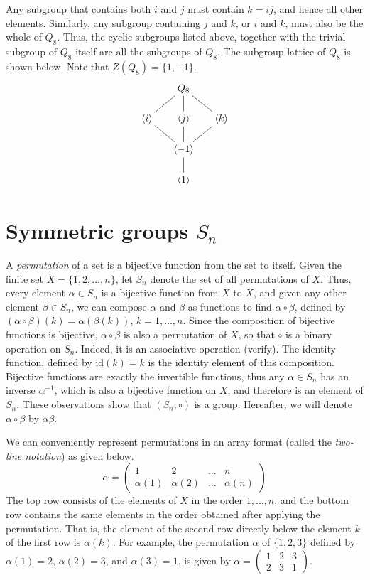 \documentclass[svgnames]{article}
\theoremstyle{definition}
\theoremstyle{remark}
\newcommand{\id}{\mathrm{id}}
\begin{document}
\begin{appendices}
Any subgroup that contains both $i$ and $j$ must contain $k = ij$, and hence all other elements. Similarly, any subgroup containing $j$ and $k$, or $i$ and $k$, must also be the whole of $Q_8$. Thus, the cyclic subgroups listed above, together with the trivial subgroup of $Q_8$ itself are all the subgroups of $Q_8$. The subgroup lattice of $Q_8$ is shown below. Note that $Z(Q_8) = \{1, -1\}$.
\begin{equation*}
\xymatrix@=1.5em{
&	Q_8 \ar@{-}[dl] \ar@{-}[d] \ar@{-}[dr]	\\
\langle i \rangle	&	\langle j \rangle	&	\langle k \rangle\\
	&	\langle -1 \rangle	\ar@{-}[ul] \ar@{-}[u] \ar@{-}[ur]	\\
	&	\langle	1 \rangle	\ar@{-}[u]
}
\end{equation*}

\section{Symmetric groups $S_n$}\label{sec:SymGroups}
A \emph{permutation} of a set is a bijective function from the set to itself. Given the finite set $X = \{1, 2, \ldots, n\}$, let $S_n$ denote the set of all permutations of $X$. Thus, every element $\alpha \in S_n$ is a bijective function from $X$ to $X$, and given any other element $\beta \in S_n$, we can compose $\alpha$ and $\beta$ as functions to find $\alpha \circ \beta$, defined by $(\alpha \circ \beta)(k) = \alpha(\beta(k))$, $k = 1, \ldots, n$. Since the composition of bijective functions is bijective, $\alpha \circ \beta$ is also a permutation of $X$, so that $\circ$ is a binary operation on $S_n$. Indeed, it is an associative operation {\small (verify)}. The identity function, defined by $\id(k) = k$ is the identity element of this composition. Bijective functions are exactly the invertible functions, thus any $\alpha \in S_n$ has an inverse $\alpha^{-1}$, which is also a bijective function on $X$, and therefore is an element of $S_n$. These observations show that $(S_n, \circ)$ is a group. Hereafter, we will denote $\alpha \circ \beta$ by $\alpha \beta$.

We can conveniently represent permutations in an array format (called the \emph{two-line notation}) as given below.
\begin{equation*}
\alpha = \begin{pmatrix}
1			&	 2	 		&	 \ldots	&	 n \\
\alpha(1)	&	\alpha(2)	&	\ldots	&	\alpha(n)
\end{pmatrix}
\end{equation*}
The top row consists of the elements of $X$ in the order $1, \ldots, n$, and the bottom row contains the same elements in the order obtained after applying the permutation. That is, the element of the second row directly below the element $k$ of the first row is $\alpha(k)$. For example, the permutation $\alpha$ of $\{1, 2, 3\}$ defined by $\alpha(1) = 2$, $\alpha(2) = 3$, and $\alpha(3) = 1$, is given by $\alpha = \begin{pmatrix}
1 & 2 & 3\\
2 & 3 & 1
\end{pmatrix}$.


\end{appendices}
\end{document}
